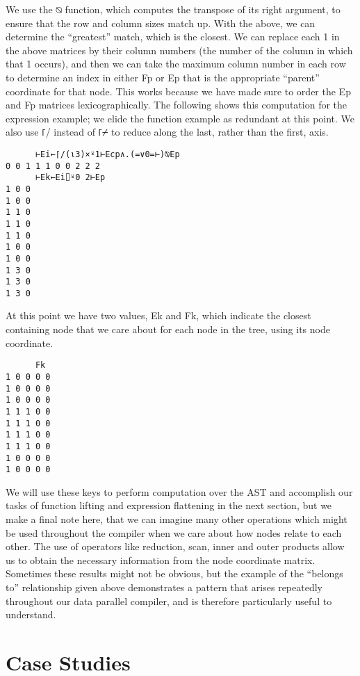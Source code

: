 \documentclass[numbers,preprint]{sigplanconf}
\begin{document}
We use the ⍉ function, which computes the transpose of its right argument, to ensure that the row 
and column sizes match up. With the above, we can determine the “greatest” match, which is the closest. 
We can replace each 1 in the above matrices by their column numbers (the number of the column in which 
that 1 occurs), and then we can take the maximum column number in each row to determine an index in 
either Fp or Ep that is the appropriate “parent” coordinate for that node. This works because we have 
made sure to order the Ep and Fp matrices lexicographically. The following shows this computation for 
the expression example; we elide the function example as redundant at this point. We also use ⌈/ instead 
of ⌈⌿ to reduce along the last, rather than the first, axis. 

\begin{verbatim}
      ⊢Ei←⌈/(⍳3)×⍤1⊢Ecp∧.(=∨0=⊢)⍉Ep
0 0 1 1 1 0 0 2 2 2
      ⊢Ek←Ei⌷⍤0 2⊢Ep 
1 0 0
1 0 0
1 1 0
1 1 0
1 1 0
1 0 0
1 0 0
1 3 0
1 3 0
1 3 0
\end{verbatim}

At this point we have two values, Ek and Fk, which indicate the closest containing node that we care about 
for each node in the tree, using its node coordinate. 

\begin{verbatim}
      Fk
1 0 0 0 0
1 0 0 0 0
1 0 0 0 0
1 1 1 0 0
1 1 1 0 0
1 1 1 0 0
1 1 1 0 0
1 0 0 0 0
1 0 0 0 0
\end{verbatim}

We will use these keys to perform computation over the AST and accomplish our tasks of function lifting and 
expression flattening in the next section, but we make a final note here, that we can imagine many other 
operations which might be used throughout the compiler when we care about how nodes relate to each 
other. The use of operators like reduction, scan, inner and outer products allow us to obtain the necessary 
information from the node coordinate matrix. Sometimes these results might not be obvious, but the 
example of the “belongs to” relationship given above demonstrates a pattern that arises repeatedly 
throughout our data parallel compiler, and is therefore particularly useful to understand. 

\section{Case Studies}

\end{document}
